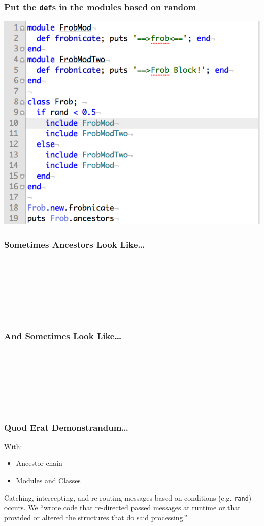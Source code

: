 \documentclass[slidestop,compress,mathserif]{beamer}
\begin{document}
\begin{frame}
	\frametitle{Put the \texttt{def}s in the modules based on random}
	\includegraphics[scale=0.45]{img/frob_random.png} \\
\end{frame}

\begin{frame}
	\frametitle{Sometimes Ancestors Look Like\ldots}
		\\
		\\
		\\
		\\
		\\
		\\
\end{frame}

\begin{frame}
	\frametitle{And Sometimes Look Like\ldots}
		\\
		\\
		\\
		\\
		\\
		\\
\end{frame}

\begin{frame}
	\frametitle{Quod Erat Demonstrandum{\ldots}}
	With:
	\begin{itemize}
		\item Ancestor chain
		\item Modules and Classes
	\end{itemize}
	\vskip 0.25cm
	Catching, intercepting, and re-routing messages based on conditions (e.g.
\texttt{rand}) occurs. 
\vskip 0.25cm 
We ``wrote code that re-directed passed messages at
runtime or that provided or altered the structures that do said processing.''

\end{frame}
\end{document}
